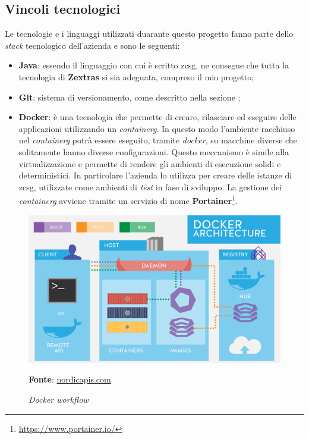     \subsection{Vincoli tecnologici}
    Le tecnologie e i linguaggi utilizzati duarante questo progetto fanno parte dello \textit{stack} tecnologico dell'azienda e sono le seguenti:
    \begin{itemize}
        \item \textbf{Java}: essendo il linguaggio con cui è scritto \gls{zcsg}, ne consegue che tutta la tecnologia di \textbf{Zextras} si sia adeguata, compreso il mio progetto;
        \item \textbf{Git}: sistema di versionamento, come descritto nella sezione ;
        \item \textbf{Docker}: è una tecnologia che permette di creare, rilasciare ed eseguire delle applicazioni utilizzando un \textit{\gls{containerg}}. In questo modo l'ambiente racchiuso nel \textit{\gls{containerg}} potrà essere eseguito, tramite \textit{docker}, su macchine diverse che solitamente hanno diverse configurazioni. Questo meccanismo è simile alla virtualizzazione e permette di rendere gli ambienti di esecuzione solidi e deterministici. In particolare l'azienda lo utilizza per creare delle istanze di \gls{zcsg}, utilizzate come ambienti di \textit{test} in fase di sviluppo. La gestione dei \textit{\gls{containerg}} avviene tramite un servizio di nome \textbf{Portainer}\footnote{\url{https://www.portainer.io/}}.
    \end{itemize}

    \begin{figure}[ht]
        \centering
        \includegraphics[width=1\textwidth]{immagini/docker.png}
        \caption{\textit{Docker workflow}}
        \textbf{Fonte}:
        \href{https://nordicapis.com/api-driven-devops-spotlight-on-docker/}{nordicapis.com}
        \label{fig: Docker workflow}
    \end{figure}

